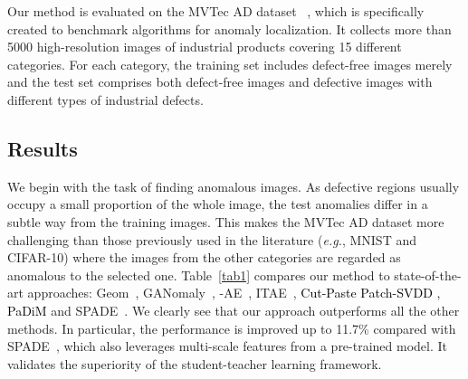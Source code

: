 \documentclass{bmvc2k}
\newcommand{\wgd}[1]{\textcolor{black}{{}#1}}
\begin{document}
Our method is evaluated on the MVTec AD dataset ~\cite{Bergmann2019}, which is specifically created to benchmark algorithms for anomaly localization. It collects more than 5000 high-resolution images of industrial products covering 15 different categories. For each category, the training set includes defect-free images merely and the test set comprises both defect-free images and defective images with different types of industrial defects. 
\fi


\subsection{Results}
We begin with the task of finding anomalous images. As defective regions usually occupy a small proportion of the whole image, the test anomalies differ in a subtle way from the training images. This makes the MVTec AD dataset more challenging than those previously used in the literature (\textit{e.g.}, MNIST and CIFAR-10) where the images from the other categories are regarded as anomalous to the selected one. Table~\ref{tab1} compares our method to state-of-the-art approaches: Geom~\cite{Golan2018}, GANomaly~\cite{Akcay2018}, -AE~\cite{Aytekin2018}, ITAE~\cite{Huang2020}, \wgd{Cut-Paste \cite{li2021cutpaste}} \wgd{Patch-SVDD \cite{yi2020patch}, PaDiM \cite{defard2021padim}} and SPADE~\cite{Cohen2020}. We clearly see that our approach outperforms all the other methods. In particular, the performance is improved up to 11.7\% compared with SPADE~\cite{Cohen2020}, which also leverages multi-scale features from a pre-trained model. It validates the superiority of the student-teacher learning framework. 
\end{document}
